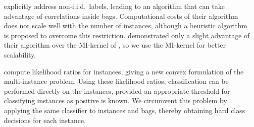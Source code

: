 \citet{zhou2009multi} explicitly address non-i.i.d.\  labels, leading to an algorithm that can take
advantage of correlations inside bags. Computational costs of their algorithm does not scale well with
the number of instances, although a heuristic algorithm is proposed to overcome this restriction.
\citet{zhou2009multi} demonstrated only a slight advantage of their algorithm over the MI-kernel of \citet{gaertner2002multi}, so
we use the MI-kernel for better scalability.

\citet{liconvex2010} compute likelihood ratios for instances, giving a new convex formulation of the multi-instance problem.
Using these likelihood ratios, classification can be performed directly on the instances, provided an appropriate
threshold for classifying instances as positive is known.
We circumvent this problem by applying the same classifier to instances and bags, thereby obtaining hard class
decisions for each instance.



